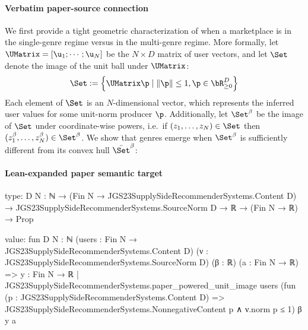 \documentclass[10pt]{article}
\begin{document}
\paragraph{Verbatim paper-source connection}
\begin{ReviewVerbatim}
We first provide a tight geometric characterization of when a marketplace is in the single-genre regime versus in the multi-genre regime. More formally, let $\UMatrix = [\u_1; \cdots; \u_N]$ be the $N \times D$ matrix of user vectors, and let $\Set$ denote the image of the unit ball under $\UMatrix$:
\begin{equation}
  \Set := \left\{\UMatrix\p \mid \|\p\| \le 1, \p \in \bR_{\ge 0}^D  \right\}
\end{equation}
Each element of $\Set$ is an $N$-dimensional vector, which represents the inferred user values for some unit-norm producer $\p$. Additionally, let $\Set^{\beta}$ be the image of $\Set$ under coordinate-wise powers, i.e.~if $(z_1, \ldots, z_N) \in \Set$ then $(z_1^{\beta}, \ldots, z_N^{\beta}) \in \Set^{\beta}$.
We show that genres emerge when $\Set^{\beta}$ is sufficiently different from its convex hull $\bar{\Set}^{\beta}$:
\end{ReviewVerbatim}



\paragraph{Lean-expanded paper semantic target}
\begin{ReviewVerbatim}
type:
{D N : ℕ} →
  (Fin N → JGS23SupplySideRecommenderSystems.Content D) →
    JGS23SupplySideRecommenderSystems.SourceNorm D → ℝ → (Fin N → ℝ) → Prop

value:
fun {D N : ℕ} (users : Fin N → JGS23SupplySideRecommenderSystems.Content D)
    (ν : JGS23SupplySideRecommenderSystems.SourceNorm D) (β : ℝ) (a : Fin N → ℝ) =>
  {y : Fin N → ℝ |
      JGS23SupplySideRecommenderSystems.paper_powered_unit_image users
        (fun (p : JGS23SupplySideRecommenderSystems.Content D) =>
          JGS23SupplySideRecommenderSystems.NonnegativeContent p ∧ ν.norm p ≤ 1)
        β y}
    a
\end{ReviewVerbatim}
\end{document}
